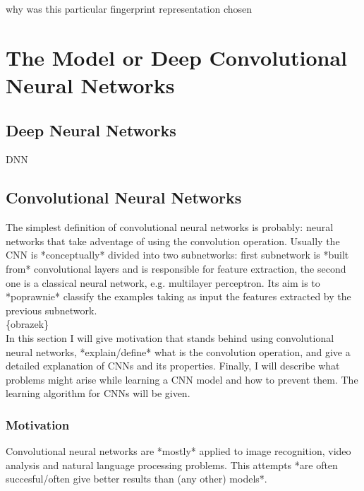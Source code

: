 \documentclass[a4paper,10pt]{report}
\begin{document}
    why was this particular fingerprint representation chosen
    
    
  \chapter{The Model or Deep Convolutional Neural Networks}
    
    \section{Deep Neural Networks}
      DNN

    \section{Convolutional Neural Networks}
      The simplest definition of convolutional neural networks is probably: neural networks that take adventage of using the convolution operation. Usually the CNN is *conceptually* divided into two subnetworks: first subnetwork is *built from* convolutional layers and is responsible for feature extraction, the second one is a classical neural network, e.g. multilayer perceptron. Its aim is to *poprawnie* classify the examples taking as input the features extracted by the previous subnetwork.\\
      
      \{obrazek\} \\ %
      
      In this section I will give motivation that stands behind using convolutional neural networks, *explain/define* what is the convolution operation, and give a detailed explanation of CNNs and its properties. Finally, I will describe what problems might arise while learning a CNN model and how to prevent them. The learning algorithm for CNNs will be given.\\
      
      \subsection{Motivation} %
	Convolutional neural networks are *mostly* applied to image recognition, video analysis and natural language processing problems. %
	This attempts *are often succesful/often give better results than (any other) models*. %
	
\end{document}
